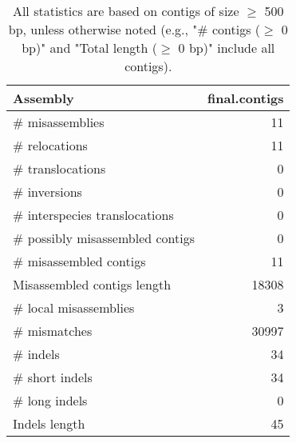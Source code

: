 \documentclass[12pt,a4paper]{article}
\begin{document}
\begin{table}[ht]
\begin{center}
\caption{All statistics are based on contigs of size $\geq$ 500 bp, unless otherwise noted (e.g., "\# contigs ($\geq$ 0 bp)" and "Total length ($\geq$ 0 bp)" include all contigs).}
\begin{tabular}{|l*{1}{|r}|}
\hline
Assembly & final.contigs \\ \hline
\# misassemblies & 11 \\ \hline
\hspace{5mm}\# relocations & 11 \\ \hline
\hspace{5mm}\# translocations & 0 \\ \hline
\hspace{5mm}\# inversions & 0 \\ \hline
\hspace{5mm}\# interspecies translocations & 0 \\ \hline
\# possibly misassembled contigs & 0 \\ \hline
\# misassembled contigs & 11 \\ \hline
Misassembled contigs length & 18308 \\ \hline
\# local misassemblies & 3 \\ \hline
\# mismatches & 30997 \\ \hline
\# indels & 34 \\ \hline
\hspace{5mm}\# short indels & 34 \\ \hline
\hspace{5mm}\# long indels & 0 \\ \hline
Indels length & 45 \\ \hline
\end{tabular}
\end{center}
\end{table}
\end{document}
